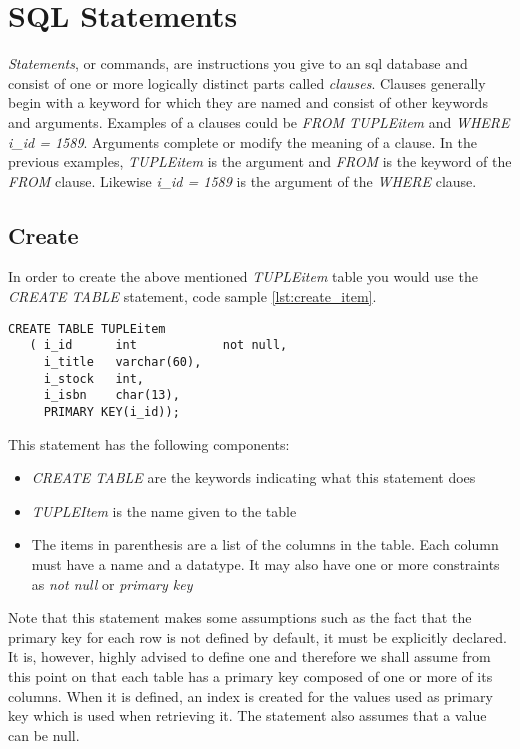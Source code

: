 \section{SQL Statements}

\emph{Statements}, or commands, are instructions you give to an \ac{sql} database and consist of one or more logically distinct parts called \emph{clauses}. Clauses generally begin with a keyword for which they are named and consist of other keywords and arguments. Examples of a clauses could be \emph{FROM TUPLEitem} and \emph{WHERE i\_id = 1589}. Arguments complete or modify the meaning of a clause. In the previous examples, \emph{TUPLEitem} is the argument and \emph{FROM} is the keyword of the \emph{FROM} clause. Likewise \emph{i\_id = 1589} is the argument of the \emph{WHERE} clause.

\subsection{Create}

In order to create the above mentioned \emph{TUPLEitem} table you would use the \emph{CREATE TABLE} statement, code sample \ref{lst:create_item}.

\lstset{
  language=SQL, 
  caption=SQL create table statement, 
  label=lst:create_item,
}


\begin{shaded}
\begin{lstlisting}
CREATE TABLE TUPLEitem 
   ( i_id      int            not null, 
     i_title   varchar(60),
     i_stock   int, 
     i_isbn    char(13),
     PRIMARY KEY(i_id));
\end{lstlisting}  
\end{shaded}  

This statement has the following components:
\begin{itemize}
	\item \emph{CREATE TABLE} are the keywords indicating what this statement does
	\item \emph{TUPLEItem} is the name given to the table
	\item The items in parenthesis are a list of the columns in the table. Each column must have a name and a datatype. It may also have one or more constraints as \emph{not null} or \emph{primary key}
\end{itemize}

Note that this statement makes some assumptions such as the fact that the primary key for each row is not defined by default, it must be explicitly declared. It is, however, highly advised to define one and therefore we shall assume from this point on that each table has a primary key composed of one or more of its columns. When it is defined, an index is created for the values used as primary key which is used when retrieving it. The statement also assumes that a value can be null.

